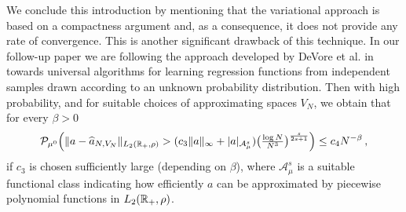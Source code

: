We conclude this introduction by mentioning that the variational approach is based on a compactness argument and, as a consequence, it does not provide any rate of convergence. This is another significant drawback of this technique.
In our follow-up paper \cite{bofohamaXX} we are following the approach developed by DeVore et al. in \cite{MR2249856,MR2327596} towards universal algorithms for learning regression functions from independent samples drawn according to an unknown probability distribution. 
Then with high probability, and for suitable choices of approximating spaces $V_N$, we obtain that for every $\beta>0$
	\begin{equation}\label{finalestimate}
		\mathcal P_{\mu^0} \Bigl(\|a- \widehat a_{N,V_N}\|_{L_2(\mathbb{R}_+,\rho)}
			>(c_3\|a\|_\infty+|a|_{\mathcal{A}^s_\mu})\bigl(\tfrac{\log N}{N^3}\bigr)^{\frac{s}{2s+1}}\Bigr)
			\leq c_4 N^{-\beta}\,,
	\end{equation}
	if $c_3$ is chosen sufficiently large (depending on $\beta$), where $\mathcal{A}^s_\mu$ is a suitable functional class indicating how efficiently $a$ can be approximated by piecewise polynomial functions in  $L_2(\mathbb{R}_+,\rho)$.